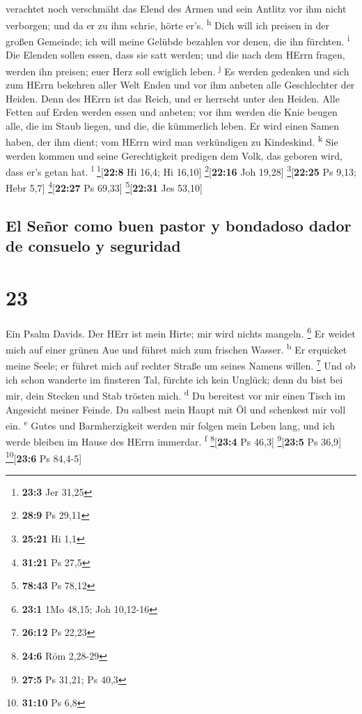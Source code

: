 verachtet noch verschmäht das Elend des Armen und sein Antlitz vor ihm
nicht verborgen; und da er zu ihm schrie, hörte er's.
\textsuperscript{h}  Dich will ich preisen in der großen
Gemeinde; ich will meine Gelübde bezahlen vor denen, die ihn fürchten.
\textsuperscript{i}  Die Elenden sollen essen, dass sie
satt werden; und die nach dem HErrn fragen, werden ihn preisen; euer
Herz soll ewiglich leben. \textsuperscript{j}  Es werden
gedenken und sich zum HErrn bekehren aller Welt Enden und vor ihm
anbeten alle Geschlechter der Heiden.  Denn des HErrn ist
das Reich, und er herrscht unter den Heiden.  Alle Fetten
auf Erden werden essen und anbeten; vor ihm werden die Knie beugen alle,
die im Staub liegen, und die, die kümmerlich leben.  Er
wird einen Samen haben, der ihm dient; vom HErrn wird man verkündigen zu
Kindeskind. \textsuperscript{k}  Sie werden kommen und
seine Gerechtigkeit predigen dem Volk, das geboren wird, dass er's getan
hat. \textsuperscript{l} \footnote{\textbf{23:3} Jer 31,25}{[}\textbf{22:8}
Hi 16,4; Hi 16,10{]} \footnote{\textbf{28:9} Ps 29,11}{[}\textbf{22:16}
Joh 19,28{]} \footnote{\textbf{25:21} Hi 1,1}{[}\textbf{22:25} Ps 9,13;
Hebr 5,7{]} \footnote{\textbf{31:21} Ps 27,5}{[}\textbf{22:27} Ps
69,33{]} \footnote{\textbf{78:43} Ps 78,12}{[}\textbf{22:31} Jes
53,10{]}

\hypertarget{el-seuxf1or-como-buen-pastor-y-bondadoso-dador-de-consuelo-y-seguridad}{%
\subsection{El Señor como buen pastor y bondadoso dador de consuelo y
seguridad}\label{el-seuxf1or-como-buen-pastor-y-bondadoso-dador-de-consuelo-y-seguridad}}

\hypertarget{section-22}{%
\section{23}\label{section-22}}

 Ein Psalm Davids. Der HErr ist mein Hirte; mir wird
nichts mangeln. \footnote{\textbf{23:1} 1Mo 48,15; Joh 10,12-16}
 Er weidet mich auf einer grünen Aue und führet mich zum
frischen Wasser. \textsuperscript{b}  Er erquicket meine
Seele; er führet mich auf rechter Straße um seines Namens willen.
\footnote{\textbf{26:12} Ps 22,23}  Und ob ich schon
wanderte im finsteren Tal, fürchte ich kein Unglück; denn du bist bei
mir, dein Stecken und Stab trösten mich. \textsuperscript{d}
 Du bereitest vor mir einen Tisch im Angesicht meiner
Feinde. Du salbest mein Haupt mit Öl und schenkest mir voll ein.
\textsuperscript{e}  Gutes und Barmherzigkeit werden mir
folgen mein Leben lang, und ich werde bleiben im Hause des HErrn
immerdar. \textsuperscript{f} \footnote{\textbf{24:6} Röm 2,28-29}{[}\textbf{23:4}
Ps 46,3{]} \footnote{\textbf{27:5} Ps 31,21; Ps 40,3}{[}\textbf{23:5} Ps
36,9{]} \footnote{\textbf{31:10} Ps 6,8}{[}\textbf{23:6} Ps 84,4-5{]}


